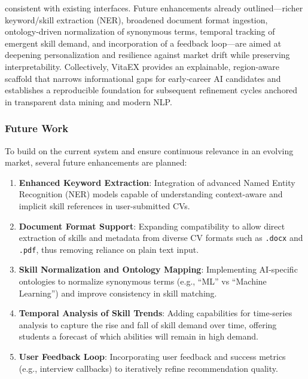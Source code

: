 \documentclass{svproc} %
\begin{document}
consistent with existing interfaces. Future enhancements already outlined—richer keyword/skill extraction (NER), broadened document format ingestion, ontology‑driven normalization of synonymous terms, temporal tracking of emergent skill demand, and incorporation of a feedback loop—are aimed at deepening personalization and resilience against market drift while preserving interpretability. Collectively, VitaEX provides an explainable, region‑aware scaffold that narrows informational gaps for early‑career AI candidates and establishes a reproducible foundation for subsequent refinement cycles anchored in transparent data mining and modern NLP.
	
	\subsubsection{Future Work}
	
	To build on the current system and ensure continuous relevance in an evolving market, several future enhancements are planned:
	
	\begin{enumerate}
		\item \textbf{Enhanced Keyword Extraction}: Integration of advanced Named Entity Recognition (NER) models capable of understanding context-aware and implicit skill references in user-submitted CVs.
		
		\item \textbf{Document Format Support}: Expanding compatibility to allow direct extraction of skills and metadata from diverse CV formats such as \texttt{.docx} and \texttt{.pdf}, thus removing reliance on plain text input.
		
		\item \textbf{Skill Normalization and Ontology Mapping}: Implementing AI-specific ontologies to normalize synonymous terms (e.g., “ML” vs “Machine Learning”) and improve consistency in skill matching.
		
		\item \textbf{Temporal Analysis of Skill Trends}: Adding capabilities for time-series analysis to capture the rise and fall of skill demand over time, offering students a forecast of which abilities will remain in high demand.
		
		\item \textbf{User Feedback Loop}: Incorporating user feedback and success metrics (e.g., interview callbacks) to iteratively refine recommendation quality.
	\end{enumerate}
	
\end{document}
